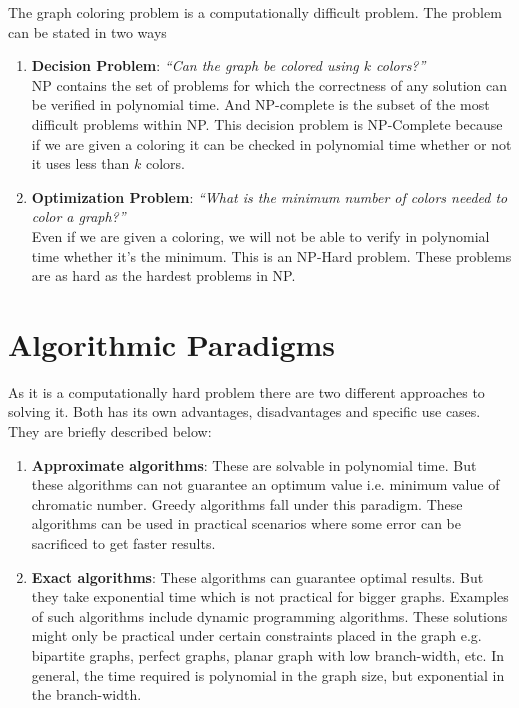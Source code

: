 \documentclass[14pt]{extreport}
\begin{document}
	    	The graph coloring problem is a computationally difficult problem. The problem can be stated in two ways 
	    	\vspace{20pt}
    		
    		\begin{enumerate}
    			\item 
	    			\textbf{Decision Problem}: \textit{``Can the graph be colored using $k$ colors?''} \vspace{5pt} \\
	    			NP contains the set of problems for which the correctness of any solution can be verified in polynomial time. And NP-complete is the subset of the most difficult problems within NP. This decision problem is NP-Complete because if we are given a coloring it can be checked in polynomial time whether or not it uses less than $k$ colors.
	    			
	    \pagebreak
	    
    			\item 
	    			\textbf{Optimization Problem}: \textit{``What is the minimum number of colors needed to color a graph?''} \vspace{5pt} \\ 
	    			Even if we are given a coloring, we will not be able to verify in polynomial time whether it's the minimum. This is an NP-Hard problem. These problems are as hard as the hardest problems in NP. 
    		\end{enumerate}
	
    	\section{Algorithmic Paradigms}
    	\vspace{20pt}
    	
    		As it is a computationally hard problem there are two different approaches to solving it. Both has its own advantages, disadvantages and specific use cases. They are briefly described below:
    		\vspace{20pt}
    		
    		\begin{enumerate}
    			\item 
    			\textbf{Approximate algorithms}: These are solvable in polynomial time. But these algorithms can not guarantee an optimum value i.e. minimum value of chromatic number. Greedy algorithms fall under this paradigm. These algorithms can be used in practical scenarios where some error can be sacrificed to get faster results. \\
    			\item 
    			\textbf{Exact algorithms}:  These algorithms can guarantee optimal results. But they take exponential time which is not practical for bigger graphs. Examples of such algorithms include dynamic programming algorithms. These solutions might only be practical under certain constraints placed in the graph e.g. bipartite graphs, perfect graphs, planar graph with low branch-width, etc. In general, the time required is polynomial in the graph size, but exponential in the branch-width.  \\
    		\end{enumerate}
    	
\end{document}
